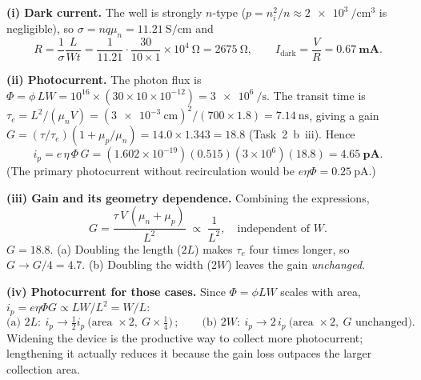 \textbf{(i) Dark current.} The well is strongly $n$-type ($p=n_i^2/n\approx\SI{2e3}{\per\cubic\cm}$ is
negligible), so $\sigma=nq\mu_n=\SI{11.21}{\siemens\per\cm}$ and
\[
R=\frac{1}{\sigma}\frac{L}{Wt}=\frac{1}{11.21}\cdot\frac{30}{10\times1}\times10^{4}\ \si{\ohm}
 =\SI{2675}{\ohm},\qquad
I_{\mathrm{dark}}=\frac{V}{R}=\mathbf{0.67\ \si{\milli\ampere}}.
\]

\textbf{(ii) Photocurrent.} The photon flux is $\Phi=\phi\,LW=10^{16}\times(30\times10\times10^{-12})
=\SI{3e6}{\per\second}$. The transit time is
$\tau_e=L^2/(\mu_n V)=(\SI{3e-3}{\cm})^2/(700\times1.8)=\SI{7.14}{\nano\second}$, giving a gain
$G=(\tau/\tau_e)(1+\mu_p/\mu_n)=14.0\times1.343=18.8$ (Task~2~b~iii). Hence
\[
i_p=e\,\eta\,\Phi\,G=(1.602\times10^{-19})(0.515)(3\times10^{6})(18.8)=\mathbf{4.65\ \si{\pico\ampere}}.
\]
(The primary photocurrent without recirculation would be $e\eta\Phi=\SI{0.25}{\pico\ampere}$.)

\textbf{(iii) Gain and its geometry dependence.} Combining the expressions,
\[
G=\frac{\tau\,V\,(\mu_n+\mu_p)}{L^{2}}\;\propto\;\frac{1}{L^{2}},\quad\text{independent of }W.
\]
$G=\mathbf{18.8}$. (a) Doubling the length ($2L$) makes $\tau_e$ four times longer, so
$G\to G/4=4.7$. (b) Doubling the width ($2W$) leaves the gain \emph{unchanged}.

\textbf{(iv) Photocurrent for those cases.} Since $\Phi=\phi LW$ scales with area,
$i_p=e\eta\Phi G\propto LW/L^{2}=W/L$:
\[
\text{(a) }2L:\ i_p\to\tfrac12 i_p \ \text{(area }\times2,\ G\times\tfrac14)\,;\qquad
\text{(b) }2W:\ i_p\to 2\,i_p\ \text{(area }\times2,\ G\text{ unchanged).}
\]
Widening the device is the productive way to collect more photocurrent; lengthening it actually
reduces it because the gain loss outpaces the larger collection area.
